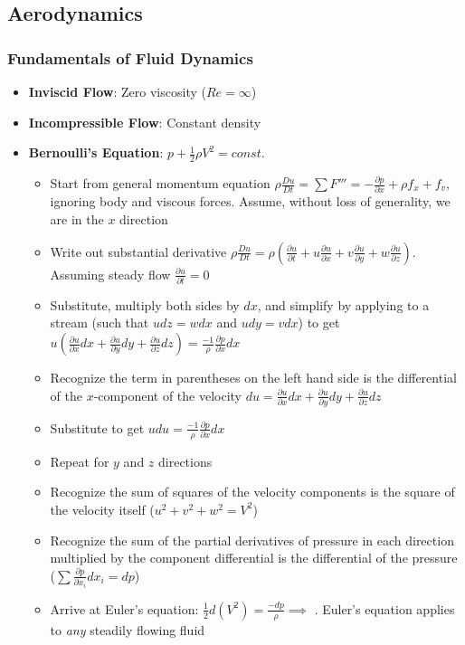 \documentclass[11pt]{article}
\newcommand{\Item}[1]{\item \textbf{#1}:}
\begin{document}
\subsection{Aerodynamics}
\subsubsection{Fundamentals of Fluid Dynamics}
\begin{itemize}
\Item{Inviscid Flow} Zero viscosity ($Re = \infty$)
\Item{Incompressible Flow} Constant density
\Item{Bernoulli's Equation} $p + \frac{1}{2}\rho V^2 = const.$\\
	\begin{itemize}
	\item Start from general momentum equation $\rho\frac{Du}{Dt} = \sum F''' = -\frac{\partial p}{\partial x}+ \rho f_x + f_v$, ignoring body and viscous forces. Assume, without loss of generality, we are in the $x$ direction
	\item Write out substantial derivative $\rho\frac{Du}{Dt} = \rho\left(\frac{\partial u}{\partial t} + u\frac{\partial u}{\partial x} + v\frac{\partial u}{\partial y} + w\frac{\partial u}{\partial z}\right)$. Assuming steady flow $\frac{\partial u}{\partial t} = 0$
	\item Substitute, multiply both sides by $dx$, and simplify by applying to a stream (such that $udz=wdx$ and $udy=vdx$) to get $u\left(\frac{\partial u}{\partial x}dx+\frac{\partial u}{\partial y}dy+\frac{\partial u}{\partial z}dz\right)=\frac{-1}{\rho}\frac{\partial p}{\partial x}dx$
	\item Recognize the term in parentheses on the left hand side is the differential of the $x$-component of the velocity $du = \frac{\partial u}{\partial x}dx+\frac{\partial u}{\partial y}dy+\frac{\partial u}{\partial z}dz$
	\item Substitute to get $udu = \frac{-1}{\rho}\frac{\partial p}{\partial x}dx$
	\item Repeat for $y$ and $z$ directions
	\item Recognize the sum of squares of the velocity components is the square of the velocity itself ($u^2+v^2+w^2=V^2$)
	\item Recognize the sum of the partial derivatives of pressure in each direction multiplied by the component differential is the differential of the pressure ($\sum\frac{\partial p}{\partial x_i}dx_i = dp$)
	\item Arrive at Euler's equation: $\frac{1}{2}d(V^2) = \frac{-dp}{\rho}\implies$ . Euler's equation applies to \textit{any} steadily flowing fluid

\end{itemize}
\end{itemize}
\end{document}
